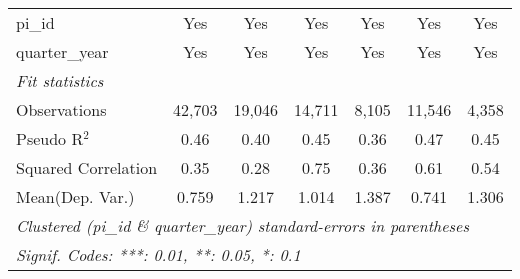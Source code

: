 \begin{tabular}{lcccccc}
   pi\_id                                                     & Yes           & Yes          & Yes            & Yes            & Yes           & Yes\\  
   quarter\_year                                              & Yes           & Yes          & Yes            & Yes            & Yes           & Yes\\  
   \midrule
   \emph{Fit statistics}\\
   Observations                                               & 42,703        & 19,046       & 14,711         & 8,105          & 11,546        & 4,358\\  
   Pseudo R$^2$                                               & 0.46          & 0.40         & 0.45           & 0.36           & 0.47          & 0.45\\  
   Squared Correlation                                        & 0.35          & 0.28         & 0.75           & 0.36           & 0.61          & 0.54\\  
Mean(Dep. Var.) & 0.759 & 1.217 & 1.014 & 1.387 & 0.741 & 1.306 \\
   \midrule \midrule
   \multicolumn{7}{l}{\emph{Clustered (pi\_id \& quarter\_year) standard-errors in parentheses}}\\
   \multicolumn{7}{l}{\emph{Signif. Codes: ***: 0.01, **: 0.05, *: 0.1}}\\
\end{tabular}
\par\endgroup
